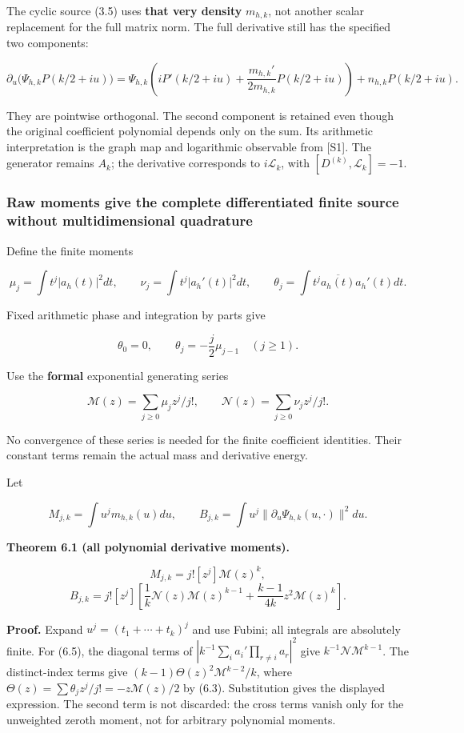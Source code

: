 The cyclic source (3.5) uses \textbf{that very density} \(m_{h,k}\), not
another scalar replacement for the full matrix norm. The full derivative
still has the specified two components:

\[\boxed{\partial_u\bigl(\Psi_{h,k}P(k/2+iu)\bigr)
=\Psi_{h,k}\left(iP'(k/2+iu)+\frac{m_{h,k}'}{2m_{h,k}}P(k/2+iu)\right)
+n_{h,k}P(k/2+iu).}\tag{6.2}\]

They are pointwise orthogonal. The second component is retained even
though the original coefficient polynomial depends only on the sum. Its
arithmetic interpretation is the graph map and logarithmic observable
from {[}S1{]}. The generator remains \(A_k\); the derivative corresponds
to \(i\mathscr L_k\), with \([D^{(k)},\mathscr L_k]=-1\).

\subsubsection{Raw moments give the complete differentiated finite
source without multidimensional
quadrature}\label{cyclic_sum:raw-moments-give-the-complete-differentiated-finite-source-without-multidimensional-quadrature}

Define the finite moments

\[\mu_j=\int t^j|a_h(t)|^2dt,\qquad
\nu_j=\int t^j|a_h'(t)|^2dt,\qquad
\theta_j=\int t^j\overline{a_h(t)}a_h'(t)dt.\]

Fixed arithmetic phase and integration by parts give

\[\theta_0=0,\qquad \theta_j=-\frac j2\mu_{j-1}\quad(j\ge1).\tag{6.3}\]

Use the \textbf{formal} exponential generating series

\[\mathcal M(z)=\sum_{j\ge0}\mu_jz^j/j!,\qquad
\mathcal N(z)=\sum_{j\ge0}\nu_jz^j/j!.\]

No convergence of these series is needed for the finite coefficient
identities. Their constant terms remain the actual mass and derivative
energy.

Let

\[M_{j,k}=\int u^jm_{h,k}(u)du,\qquad
B_{j,k}=\int u^j\|\partial_u\Psi_{h,k}(u,\cdot)\|^2du.\]

\textbf{Theorem 6.1 (all polynomial derivative moments).}

\[\boxed{M_{j,k}=j![z^j]\mathcal M(z)^k,}\tag{6.4}\]
\[\boxed{B_{j,k}=j![z^j]\left[
\frac1k\mathcal N(z)\mathcal M(z)^{k-1}
+\frac{k-1}{4k}z^2\mathcal M(z)^k\right].}\tag{6.5}\]

\textbf{Proof.} Expand \(u^j=(t_1+\cdots+t_k)^j\) and use Fubini; all
integrals are absolutely finite. For (6.5), the diagonal terms of
\(|k^{-1}\sum_i a_i'\prod_{r\ne i}a_r|^2\) give
\(k^{-1}\mathcal N\mathcal M^{k-1}\). The distinct-index terms give
\((k-1)\Theta(z)^2\mathcal M^{k-2}/k\), where
\(\Theta(z)=\sum\theta_jz^j/j!=-z\mathcal M(z)/2\) by (6.3).
Substitution gives the displayed expression. The second term is not
discarded: the cross terms vanish only for the unweighted zeroth moment,
not for arbitrary polynomial moments.

